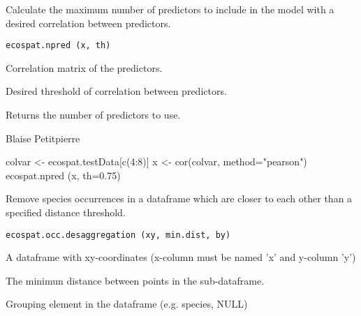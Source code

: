 \documentclass[a4paper]{book}
\begin{document}
%
\begin{Description}\relax
Calculate the maximum number of predictors to include in the model with a desired correlation between predictors.
\end{Description}
%
\begin{Usage}
\begin{verbatim}
ecospat.npred (x, th)
\end{verbatim}
\end{Usage}
%
\begin{Arguments}
\begin{ldescription}
\item[\code{x}] Correlation matrix of the predictors.
\item[\code{th}] Desired threshold of correlation between predictors.
\end{ldescription}
\end{Arguments}
%
\begin{Value}
Returns the number of predictors to use.
\end{Value}
%
\begin{Author}\relax
Blaise Petitpierre 
\end{Author}
%
\begin{Examples}
\begin{ExampleCode}
colvar <- ecospat.testData[c(4:8)]
x <- cor(colvar, method="pearson")
ecospat.npred (x, th=0.75)
\end{ExampleCode}
\end{Examples}
%
\begin{Description}\relax
Remove species occurrences in a dataframe which are closer to each other than a specified distance threshold.
\end{Description}
%
\begin{Usage}
\begin{verbatim}
ecospat.occ.desaggregation (xy, min.dist, by)
\end{verbatim}
\end{Usage}
%
\begin{Arguments}
\begin{ldescription}
\item[\code{xy}] A dataframe with xy-coordinates (x-column must be named 'x' and y-column 'y')
\item[\code{min.dist}] The minimun distance between points in the sub-dataframe.
\item[\code{by}] Grouping element in the dataframe (e.g. species, NULL)
\end{ldescription}
\end{Arguments}
\end{document}
